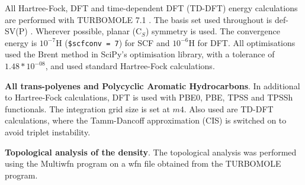 \documentclass[12pt]{article}
\begin{document}
All Hartree-Fock, DFT and time-dependent DFT (TD-DFT) energy calculations are performed with TURBOMOLE 7.1 \cite{TURBOMOLE}. The basis set used throughout is def-SV(P) \cite{defsvp}. Wherever possible, planar (C\(_{S}\)) symmetry is used. The convergence energy is \(10^{-7}\)H (\texttt{\$scfconv = 7}) for SCF and \(10^{-6}\)H for DFT. All optimisations used the Brent method in SciPy's optimisation library, with a tolerance of \(1.48*10^{-08}\), and used standard Hartree-Fock calculations.\cite{scipy}

\textbf{All trans-polyenes and Polycyclic Aromatic Hydrocarbons}. In additional to Hartree-Fock calculations, DFT is used with PBE0, PBE, TPSS and TPSSh functionals. \cite{pbe0,pbe,tpss,tpssh} The integration grid size is set at \(m4\). Also used are TD-DFT calculations, where the Tamm-Dancoff approximation (CIS) \cite{tammdancoff} is switched on to avoid triplet instability.

\textbf{Topological analysis of the density}. The topological analysis was performed using the Multiwfn
program on a wfn file obtained from the TURBOMOLE program.\cite{multiwfn}

\clearpage



%
%



\clearpage
\end{document}
